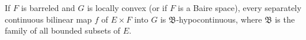 If $F$ is barreled and $G$ is locally convex (or if $F$ is a Baire space), every separately continuous bilinear map $f$ of $E \times F$ into $G$ is $\mathfrak{B}$-hypocontinuous, where $\mathfrak{B}$ is the family of all bounded subsets of $E$.
